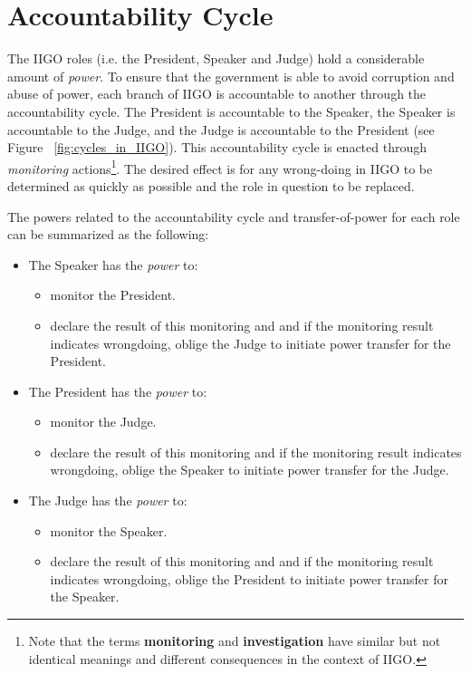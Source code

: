\section{Accountability Cycle}
\label{sec:accountability}

The IIGO roles (i.e. the President, Speaker and Judge) hold a considerable amount of \emph{power}. To ensure that the government is able to avoid corruption and abuse of power, each branch of IIGO is accountable to another through the accountability cycle.
The President is accountable to the Speaker, the Speaker is accountable to the Judge, and the Judge is accountable to the President (see Figure~ \ref{fig:cycles_in_IIGO}). This accountability cycle is enacted through \emph{monitoring} actions\footnote{Note that the terms \textbf{monitoring} and \textbf{investigation} have similar but not identical meanings and different consequences in the context of IIGO.}. The desired effect is for any wrong-doing in IIGO to be determined as quickly as possible and the role in question to be replaced.

The powers related to the accountability cycle and transfer-of-power for each role can be summarized as the following:
\begin{itemize}
    \item The Speaker has the \emph{power} to:
    \begin{itemize}
        \item monitor the President.
        \item declare the result of this monitoring and and if the monitoring result indicates wrongdoing, oblige the Judge to initiate power transfer for the President.
    \end{itemize}
    \item The President has the \emph{power} to:
    \begin{itemize}
        \item monitor the Judge.
        \item declare the result of this monitoring and if the monitoring result indicates wrongdoing, oblige the Speaker to initiate power transfer for the Judge.
    \end{itemize}
    \item The Judge has the \emph{power} to:
    \begin{itemize}
        \item  monitor the Speaker.
        \item declare the result of this monitoring and and if the monitoring result indicates wrongdoing, oblige the President to initiate power transfer for the Speaker.
    \end{itemize}
\end{itemize}

